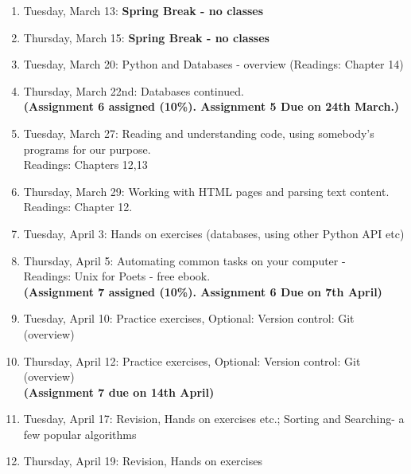 \documentclass[11pt,a4paper]{article}
\begin{document}
\begin{enumerate}
  \item Tuesday, March 13: \textbf{Spring Break - no classes}
  
  \item Thursday, March 15:  \textbf{Spring Break - no classes}

  \item Tuesday, March 20: Python and Databases - overview (Readings: Chapter 14)

  \item Thursday, March 22nd: Databases continued.
\\ \textbf{ (Assignment 6 assigned (10\%). Assignment 5 Due on 24th March.)} %

\item Tuesday, March 27:  Reading and understanding code, using somebody's programs for our purpose. \\ Readings: Chapters 12,13

\item Thursday, March 29:  Working with HTML pages and parsing text content. \\Readings: Chapter 12.

\item Tuesday, April 3: Hands on exercises (databases, using other Python API etc)

\item Thursday, April 5: Automating common tasks on your computer - 
  \\ Readings: Unix for Poets - free ebook.
 \\ \textbf{  (Assignment 7 assigned (10\%). Assignment 6 Due on 7th April)}

\item Tuesday, April 10: Practice exercises, Optional: Version control: Git (overview) 

 \item Thursday, April 12: Practice exercises, Optional: Version control: Git (overview) 
\\ \textbf{ (Assignment 7 due on 14th April)}

  \item Tuesday, April 17:  Revision, Hands on exercises etc.; Sorting and Searching- a few popular algorithms

  \item Thursday, April 19:  Revision, Hands on exercises 


\end{enumerate}
\end{document}
